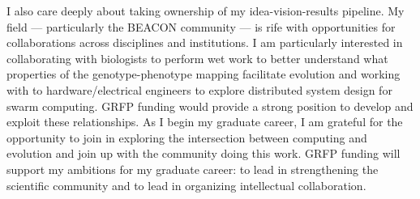 I also care deeply about taking ownership of my idea-vision-results pipeline.
My field --- particularly the BEACON community --- is rife with opportunities for collaborations across disciplines and institutions.
I am particularly interested in collaborating with biologists to perform wet work to better understand what properties of the genotype-phenotype mapping facilitate evolution and working with to hardware/electrical engineers to explore distributed system design for swarm computing.
GRFP funding would provide a strong position to develop and exploit these relationships.
As I begin my graduate career, I am grateful for the opportunity to join in exploring the intersection between computing and evolution and join up with the community doing this work.
GRFP funding will support my ambitions for my graduate career: to lead in strengthening the scientific community and to lead in organizing intellectual collaboration.
